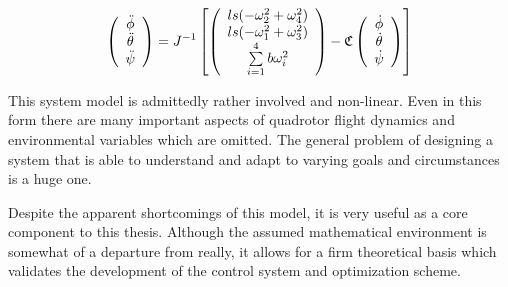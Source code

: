 \begin{equation}
    \label{angulareq}
    \left(
        \begin{array}{c}
           \ddot{\phi}\\
           \ddot{\theta}\\
           \ddot{\psi}\\
        \end{array}
    \right) = J^{-1}
    \left[ \left(
        \begin{array}{c}
            l s (-\omega_2^2 + \omega_4^2)\\
            l s (-\omega_1^2 + \omega_3^2)\\ 
            \sum \limits_{i=1}^4 b \omega_i^2\\
        \end{array}
    \right) -
    \cc
    \left(
        \begin{array}{c}
           \dot{\phi}\\
           \dot{\theta}\\
           \dot{\psi}\\
        \end{array}
    \right)
    \right]
\end{equation}


This system model is admittedly rather involved and non-linear. Even in this form there are many important aspects of quadrotor flight dynamics and environmental variables which are omitted. The general problem of designing a system that is able to understand and adapt to varying goals and circumstances is a huge one. 

Despite the apparent shortcomings of this model, it is very useful as a core component to this thesis. Although the assumed mathematical environment is somewhat of a departure from really, it allows for a firm theoretical basis which validates the development of the control system and optimization scheme.





